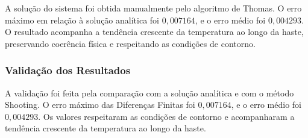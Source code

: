 \begin{table}[H]
    \centering
    \caption{Comparação ponto a ponto das Diferenças Finitas no problema da haste.}
\end{table}

A solução do sistema foi obtida manualmente pelo algoritmo de Thomas. O erro máximo em relação à solução analítica foi \(0{,}007164\), e o erro médio foi \(0{,}004293\). O resultado acompanha a tendência crescente da temperatura ao longo da haste, preservando coerência física e respeitando as condições de contorno.

\subsubsection{Validação dos Resultados}

A validação foi feita pela comparação com a solução analítica e com o método Shooting. O erro máximo das Diferenças Finitas foi \(0{,}007164\), e o erro médio foi \(0{,}004293\). Os valores respeitaram as condições de contorno e acompanharam a tendência crescente da temperatura ao longo da haste.

